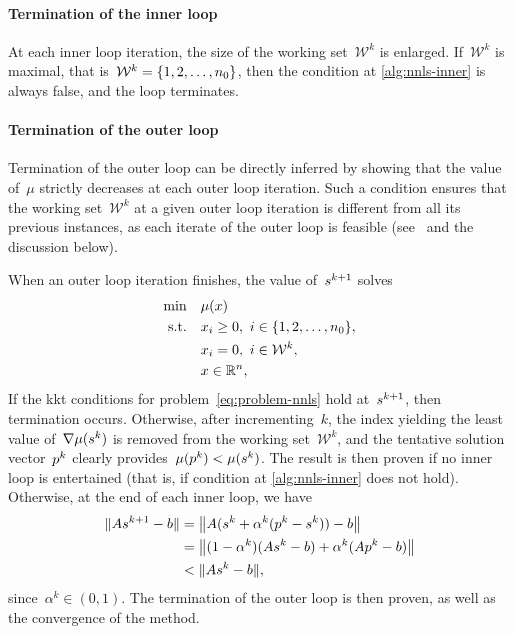 \paragraph{Termination of the inner loop}

At each inner loop iteration, the size of the working set~$\mathcal{W}^k$ is enlarged.
If~$\mathcal{W}^k$ is maximal, that is~$\mathcal{W}^k = \{1, 2, \dots, n_0\}$, then the condition at \cref{alg:nnls-inner} is always false, and the loop terminates.

\paragraph{Termination of the outer loop}

Termination of the outer loop can be directly inferred by showing that the value of~$\mu$ strictly decreases at each outer loop iteration.
Such a condition ensures that the working set~$\mathcal{W}^k$ at a given outer loop iteration is different from all its previous instances, as each iterate of the outer loop is feasible (see~\cite[Lem.~23.17]{Lawson_Hanson_1987} and the discussion below).

When an outer loop iteration finishes, the value of~$\sstep[k + 1]$ solves
\begin{align*}
    \min        & \quad \mu(\iter)\\
    \text{s.t.} & \quad \iter_i \ge 0, ~ i \in \set{1, 2, \dots, n_0},\\
                & \quad \iter_i = 0, ~ i \in \mathcal{W}^k,\\
                & \quad \iter \in \R^n,
\end{align*}
If the \gls{kkt} conditions for problem~\cref{eq:problem-nnls} hold at~$\sstep[k + 1]$, then termination occurs.
Otherwise, after incrementing~$k$, the index yielding the least value of~$\nabla \mu(\sstep[k])$ is removed from the working set~$\mathcal{W}^k$, and the tentative solution vector~$\pstep[k]$ clearly provides~$\mu(\pstep[k]) < \mu(\sstep[k])$.
The result is then proven if no inner loop is entertained (that is, if condition at \cref{alg:nnls-inner} does not hold).
Otherwise, at the end of each inner loop, we have
\begin{align*}
    \norm{A \sstep[k + 1] - b}  & = \norm[\big]{A (\sstep[k] + \alpha^k (\pstep[k] - \sstep[k])) - b}\\
                                & = \norm[\big]{(1 - \alpha^k) (A \sstep[k] - b) + \alpha^k (A \pstep[k] - b)}\\
                                & < \norm{A \sstep[k] - b},
\end{align*}
since~$\alpha^k \in (0, 1)$.
The termination of the outer loop is then proven, as well as the convergence of the method.

